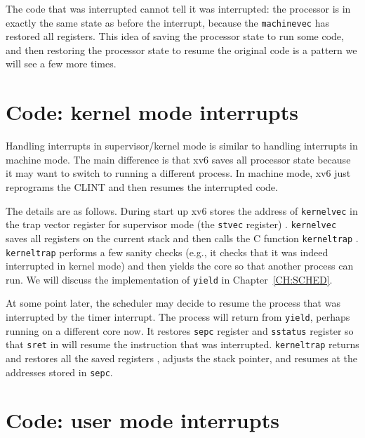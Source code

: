 The code that was interrupted cannot tell it was interrupted: the
processor is in exactly the same state as before the interrupt,
because the \lstinline{machinevec} has restored all registers.  This
idea of saving the processor state to run some code, and then
restoring the processor state to resume the original code is a pattern
we will see a few more times.

\section{Code: kernel mode interrupts}

Handling interrupts in supervisor/kernel mode is similar to handling
interrupts in machine mode.  The main difference is that xv6 saves all
processor state because it may want to switch to running a different
process.  In machine mode, xv6 just reprograms the CLINT and then
resumes the interrupted code.

The details are as follows. During start up xv6 stores the address of
\lstinline{kernelvec} in the trap vector register for supervisor mode
(the \lstinline{stvec} register)
.  \lstinline{kernelvec} saves
all registers on the current stack
and then calls the C function \lstinline{kerneltrap}
.  \lstinline{kerneltrap}
 performs a few sanity checks
(e.g., it checks that it was indeed interrupted in kernel mode) and
then yields the core so that another process can run.  We will discuss
the implementation of \lstinline{yield} in Chapter~\ref{CH:SCHED}.

At some point later, the scheduler may decide to resume the process
that was interrupted by the timer interrupt. The process will return
from \lstinline{yield}, perhaps running on a different core now.  It
restores \lstinline{sepc} register and \lstinline{sstatus} register so
that \lstinline{sret} in  will
resume the instruction that was interrupted.  \lstinline{kerneltrap}
returns and restores all the saved registers
, adjusts the stack
pointer, and resumes at the addresses stored in \lstinline{sepc}.

\section{Code: user mode interrupts}

